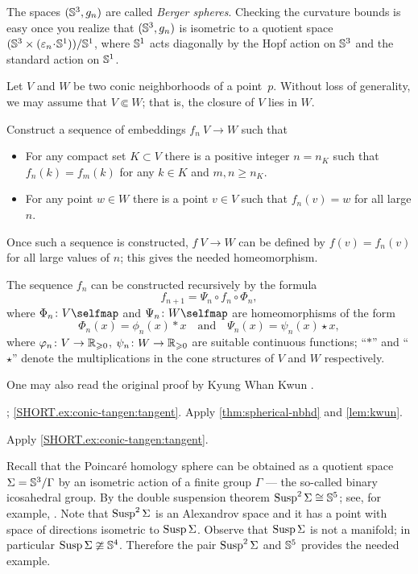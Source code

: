 The spaces $(\mathbb{S}^3,g_n)$ are called \emph{Berger spheres}.
Checking the curvature bounds is easy once you realize that $(\mathbb{S}^3,g_n)$ is isometric to a quotient space $(\SSS^3\times (\eps_n\cdot \SSS^1))/\SSS^1$, where $\mathbb{S}^1$ acts diagonally by the Hopf action on $\mathbb{S}^3$ and the standard action on $\mathbb{S}^1$.

Let $V$ and $W$ be two conic neighborhoods of a point~$p$.
Without loss of generality, we may assume that $V\Subset W$;
that is, the closure of $V$ lies in $W$.

Construct a sequence of embeddings $f_n\:V\to W$
such that 
\begin{itemize}
\item 
For any compact set $K\subset V$ 
there is a positive integer $n=n_K$ such that 
$f_n(k)=f_m(k)$ for any $k\in K$ and $m, n \ge n_K$.
\item For any point $w\in W$ there is a point $v\in V$ such that $f_n(v)=w$ for all large $n$.
\end{itemize}

Once such a sequence is constructed, $f\:V\to W$ can be defined by $f(v)=f_n(v)$ for all large values of $n$; this gives the needed homeomorphism.

The sequence $f_n$ can be constructed recursively by the formula
\[f_{n+1}=\Psi_n\circ f_n\circ \Phi_n,\]
where $\Phi_n\:V\selfmap$
and $\Psi_n\:W\selfmap$
are homeomorphisms
of the form 
\[\Phi_n(x)=\phi_n(x)\ast x\quad \text{and}\quad \Psi_n(x)=\psi_n(x)\star x,\]
where $\varphi_n\colon V\to \mathbb{R}_{\geqslant 0}$, $\psi_n\colon W\to \mathbb{R}_{\geqslant 0}$ are suitable continuous functions;
``$\ast$'' and ``$\star$'' denote the multiplications in the cone structures of $V$ and $W$ respectively.

One may also read the original proof by Kyung Whan Kwun \cite{kwun1964}.

\parbf{\ref{ex:conic-tangent}}; \ref{SHORT.ex:conic-tangen:tangent}.
Apply \ref{thm:spherical-nbhd} and \ref{lem:kwun}.

Apply \ref{SHORT.ex:conic-tangen:tangent}.

Recall that the Poincaré homology sphere can be obtained as a quotient space $\Sigma=\mathbb{S}^3/\Gamma$ by an isometric action of a finite group $\Gamma$ --- the so-called binary icosahedral group.
By the double suspension theorem
$\mathop{\rm Susp}\nolimits^2\Sigma\cong\mathbb{S}^5$; see, for example, \cite{daverman}.
Note that $\mathop{\rm Susp}\nolimits^2\Sigma$ is an Alexandrov space and it has a point with space of directions isometric to $\mathop{\rm Susp}\nolimits\Sigma$.
Observe that $\mathop{\rm Susp}\nolimits\Sigma$ is not a manifold; in particular $\mathop{\rm Susp}\nolimits\Sigma\ncong\mathbb{S}^4$.
Therefore the pair $\mathop{\rm Susp}\nolimits^2\Sigma$ and $\mathbb{S}^5$ provides the needed example.

